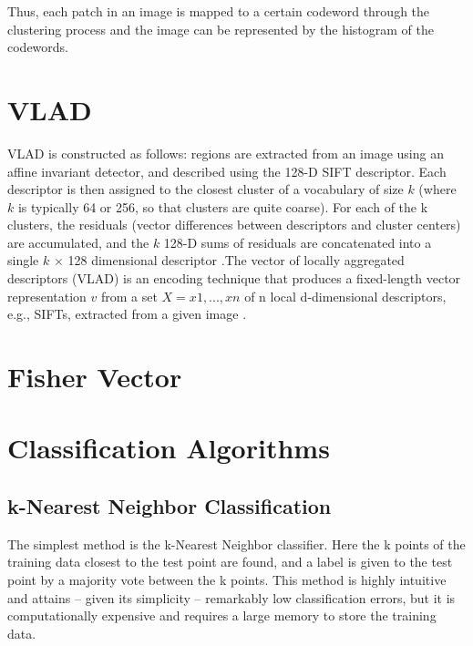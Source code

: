 \documentclass[12pt]{article}
\numberwithin{equation}{section}
\numberwithin{table}{section}
\numberwithin{figure}{section}
\begin{document}
Thus, each patch in an image is mapped to a certain codeword through the clustering process and the image can be represented by the histogram of the codewords.









\section{VLAD} \label{vlad}

VLAD is constructed as follows: regions are extracted from an image using an affine invariant detector, and described using the 128-D SIFT descriptor. Each descriptor is then assigned to the closest cluster of a vocabulary of size $k$ (where $k$ is typically 64 or 256, so that clusters are quite coarse). For each of the k clusters, the residuals (vector differences between descriptors and cluster centers) are accumulated, and the $k$ 128-D sums of residuals are concatenated into a single $k$ × 128 dimensional descriptor \cite{Arandjelovic2013}.The vector of locally aggregated descriptors (VLAD) is an encoding technique that produces a fixed-length vector representation $v$ from a set $X = {x1, . . . , xn}$ of n local d-dimensional descriptors, e.g., SIFTs, extracted from a given image \cite{Delhumeau2013}.

\section{Fisher Vector} \label{fv}

\cite{Sanchez2013}


\section{Classification Algorithms} \label{classalgs}

\subsection{k-Nearest Neighbor Classification} \label{knn}
The simplest method is the k-Nearest Neighbor classifier. Here the k points of the training data closest to the test point are found, and a label is given to the test point by a majority vote between the k points. This method is highly intuitive and attains – given its simplicity – remarkably low classification errors, but it is computationally expensive and requires a large memory to store the training data.
\end{document}
